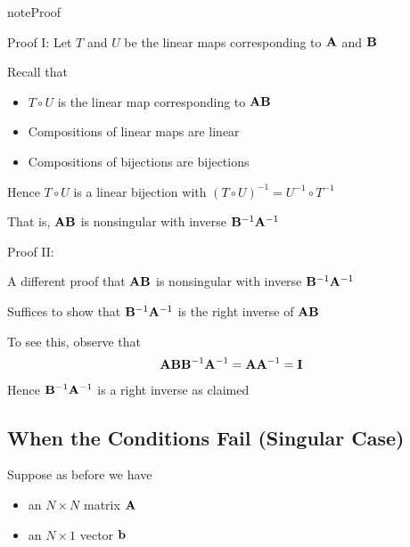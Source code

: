 \documentclass[letterpaper,10pt,english]{jupyterBook}
\begin{document}
\begin{sphinxadmonition}{note}{Proof}

\sphinxAtStartPar
Proof I: Let \(T\) and \(U\) be the linear maps corresponding to \({\bf A}\) and
\({\bf B}\)

\sphinxAtStartPar
Recall that
\begin{itemize}
\item {} 
\sphinxAtStartPar
\(T \circ U\) is the linear map corresponding to \({\bf A} {\bf B}\)

\item {} 
\sphinxAtStartPar
Compositions of linear maps are linear

\item {} 
\sphinxAtStartPar
Compositions of bijections are bijections

\end{itemize}

\sphinxAtStartPar
Hence \(T \circ U\) is a linear bijection with \((T \circ U)^{-1} = U^{-1} \circ T^{-1}\)

\sphinxAtStartPar
That is, \({\bf A}{\bf B}\) is nonsingular with inverse \({\bf B}^{-1} {\bf A}^{-1}\)

\sphinxAtStartPar
Proof II:

\sphinxAtStartPar
A different proof that \({\bf A} {\bf B}\) is nonsingular with inverse
\({\bf B}^{-1} {\bf A}^{-1}\)

\sphinxAtStartPar
Suffices to show that \({\bf B}^{-1} {\bf A}^{-1}\) is the right inverse of \({\bf A} {\bf B}\)

\sphinxAtStartPar
To see this, observe that
\begin{equation*}
\begin{split}
%
{\bf A} {\bf B} {\bf B}^{-1} {\bf A}^{-1}
= {\bf A} {\bf A}^{-1}
= {\bf I}
%
\end{split}
\end{equation*}
\sphinxAtStartPar
Hence \({\bf B}^{-1} {\bf A}^{-1}\) is a right inverse as claimed
\end{sphinxadmonition}


\subsection{When the Conditions Fail (Singular Case)}
\label{\detokenize{05.linear_algebra:when-the-conditions-fail-singular-case}}
\sphinxAtStartPar
Suppose as before we have
\begin{itemize}
\item {} 
\sphinxAtStartPar
an \(N \times N\) matrix \({\bf A}\)

\item {} 
\sphinxAtStartPar
an \(N \times 1\) vector \({\bf b}\)

\end{itemize}
\end{document}
